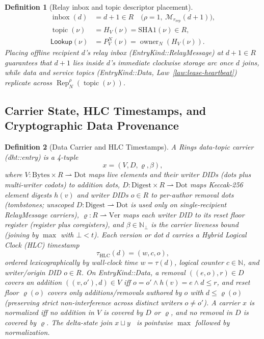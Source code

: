 \documentclass[journal]{IEEEtran}
\newtheorem{definition}{Definition}
\DeclareRobustCommand{\code}[1]{{\ttfamily\renewcommand{\_}{\textunderscore\allowbreak}#1}}
\begin{document}
\begin{definition}[Relay inbox and topic descriptor placement]
\[
\begin{aligned}
  \operatorname{inbox}(d) &= d+1 \in R\quad\bigl(\rho=1,\ \mathcal{M}_{r_{\mathrm{rep}}}(d+1)\bigr),\\
  \operatorname{topic}(\nu) &= H_V(\nu)=\mathrm{SHA1}(\nu)\in R,\\
  \mathsf{Lookup}(\nu) &= P^N_V(\nu)=\operatorname{owner}_N(H_V(\nu)).
\end{aligned}
\]
Placing offline recipient $d$'s relay inbox (\code{EntryKind::RelayMessage}) at $d+1\in R$ guarantees that $d+1$ lies inside $d$'s immediate clockwise storage arc once $d$ joins, while data and service topics (\code{EntryKind::Data}, Law~\ref{law:lease-heartbeat}) replicate across $\operatorname{Rep}^\rho_N(\operatorname{topic}(\nu))$.
\end{definition}

\subsection{Carrier State, HLC Timestamps, and Cryptographic Data Provenance}

\begin{definition}[Data Carrier and HLC Timestamps]\label{def:carrier}
A Rings data-topic carrier (\code{dht::entry}) is a 4-tuple
\[
  x=(V,D,\varrho,\beta),
\]
where $V:\mathrm{Bytes}\times R\rightharpoonup\mathrm{Dot}$ maps live elements and their writer DIDs (\code{dots} plus multi-writer \code{co\_dots}) to addition dots, $D:\mathrm{Digest}\times R\rightharpoonup\mathrm{Dot}$ maps Keccak-256 element digests $h(v)$ and writer DIDs $o\in R$ to per-author removal dots (tombstones; unscoped $D:\mathrm{Digest}\rightharpoonup\mathrm{Dot}$ is used only on single-recipient \code{RelayMessage} carriers), $\varrho:R\rightharpoonup\mathrm{Ver}$ maps each writer DID to its reset floor register (\code{register} plus \code{co\_registers}), and $\beta\in\mathbb{N}_\bot$ is the carrier liveness bound (joining by $\max$ with $\bot<t$).  Each version or dot $d$ carries a Hybrid Logical Clock (HLC) timestamp~\cite{Kulkarni2014}
\[
  \tau_{\mathrm{HLC}}(d)=(w,c,o),
\]
ordered lexicographically by wall-clock time $w=\tau(d)$, logical counter
$c\in\mathbb{N}$, and writer/origin DID $o\in R$.  On \code{EntryKind::Data}, a removal $((e,o),r)\in D$
\emph{covers} an addition $((v,o'),d)\in V$ iff $o=o'\land h(v)=e\land d\le r$, and reset floor $\varrho(o)$ covers only additions/removals authored by $o$ with $d\le\varrho(o)$ (preserving strict non-interference across distinct writers $o\neq o'$).  A carrier $x$
is \emph{normalized} iff no addition in $V$ is covered by $D$ or $\varrho$, and
no removal in $D$ is covered by $\varrho$.  The delta-state join $x\sqcup y$~\cite{Almeida2018,Preguica2018} is pointwise $\max$
followed by normalization.
\end{definition}
\end{document}
